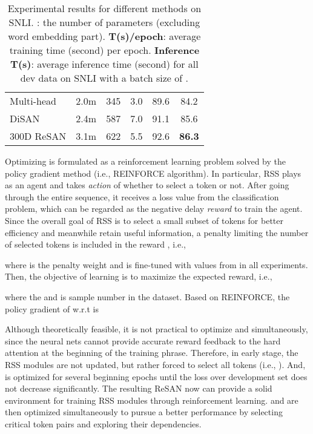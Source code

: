 \documentclass{article}
\begin{document}
\begin{table*}[htbp]
\begin{tabular}{@{}lccccc@{}}
		Multi-head \cite{vaswani2017attention}&            2.0m&             345&	3.0&                  89.6&               84.2\\ 
		DiSAN \cite{shen2017disan}&            2.4m&             587&	7.0&             91.1&               85.6\\ \midrule
		300D ReSAN&            3.1m&            622&	5.5&              92.6&               \textbf{86.3}\\ \bottomrule
	\end{tabular}
	\caption{Experimental results for different methods on SNLI. \textbf{}: the number of parameters (excluding word embedding part). \textbf{T(s)/epoch}: average training time (second) per epoch. \textbf{Inference T(s)}: average inference time (second) for all dev data on SNLI with a batch size of .} 
	\label{table:exps_snli_accu}
\end{table*}


Optimizing  is formulated as a reinforcement learning problem solved by the policy gradient method (i.e., REINFORCE algorithm). In particular, RSS plays as an agent and takes \textit{action} of whether to select a token or not. After going through the entire sequence, it receives a loss value from the classification problem, which can be regarded as the negative delay \textit{reward} to train the agent. Since the overall goal of RSS is to select a small subset of tokens for better efficiency and meanwhile retain useful information, a penalty limiting the number of selected tokens is included in the reward , i.e., 

where  is the penalty weight and is fine-tuned with values from  in all experiments. Then, the objective of learning  is to maximize the expected reward, i.e.,

where the  and  is sample number in the dataset. Based on  REINFORCE, the policy gradient of  w.r.t  is


Although theoretically feasible, it is not practical to optimize  and  simultaneously, since the neural nets cannot provide accurate reward feedback to the hard attention at the beginning of the training phrase. Therefore, in early stage, the RSS modules are not updated, but rather forced to select all tokens (i.e.,  ). And,  is optimized for several beginning epochs until the loss over development set does not decrease significantly. The resulting ReSAN now can provide a solid environment for training RSS modules through reinforcement learning.  and  are then optimized simultaneously to pursue a better performance by selecting critical token pairs and exploring their dependencies. 
\end{document}
